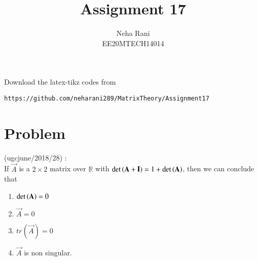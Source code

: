 \documentclass[journal,12pt]{IEEEtran}
\begin{document}
     \def\rightbox#1{\makebox[0in][r]{#1}}
     \def\centbox#1{\makebox[0in]{#1}}
     \def\topbox#1{\raisebox{-\baselineskip}[0in][0in]{#1}}
     \def\midbox#1{\raisebox{-0.5\baselineskip}[0in][0in]{#1}}
\vspace{3cm}
\title{Assignment 17}
\author{Neha Rani\\EE20MTECH14014}
\maketitle
\bigskip
\renewcommand{\thefigure}{\theenumi}
\renewcommand{\thetable}{\theenumi}
%
Download the latex-tikz codes from 
%
\begin{lstlisting}
https://github.com/neharani289/MatrixTheory/Assignment17
\end{lstlisting}
\section{\textbf{Problem}}
%
(ugcjune/2018/28) : \\
If $\vec{A}$ is a $2\times2$ matrix over $\mathbb{R}$ with $\det\left(\mathbf{A}+\mathbf{I}\right) = 1+\det\left(\mathbf{A}\right)$, then we can conclude that\\
\begin{enumerate}
    \item $\det\left(\mathbf{A}\right)=0$\\
    \item $\vec{A}=0$\\
    \item  $tr(\vec{A})=0$\\
    \item $\vec{A}$ is non singular.
\end{enumerate}
\end{document}
